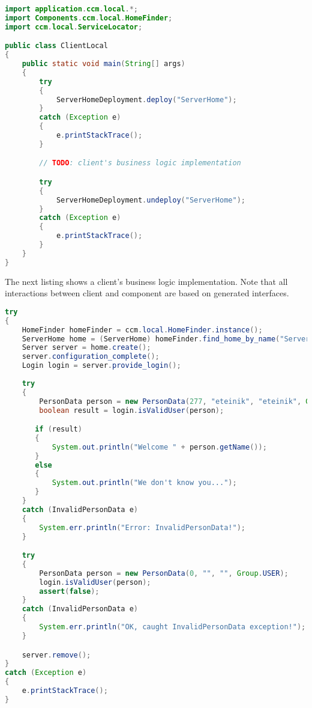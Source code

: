 \begin{footnotesize}
\begin{lstlisting}[language=Java]
import application.ccm.local.*;
import Components.ccm.local.HomeFinder;
import ccm.local.ServiceLocator;

public class ClientLocal
{
    public static void main(String[] args)
    {
        try
        {
            ServerHomeDeployment.deploy("ServerHome");
        }
        catch (Exception e)
        {
            e.printStackTrace();
        }

        // TODO: client's business logic implementation

        try
        {
            ServerHomeDeployment.undeploy("ServerHome");
        }
        catch (Exception e)
        {
            e.printStackTrace();
        }
    }
}
\end{lstlisting}
\end{footnotesize}

The next listing shows a client's business logic implementation. Note that all
interactions between client and component are based on generated interfaces.

\begin{footnotesize}
\begin{lstlisting}[language=Java]
try
{            
    HomeFinder homeFinder = ccm.local.HomeFinder.instance();
    ServerHome home = (ServerHome) homeFinder.find_home_by_name("ServerHome");
    Server server = home.create();
    server.configuration_complete();
    Login login = server.provide_login();
                        
    try
    {
        PersonData person = new PersonData(277, "eteinik", "eteinik", Group.USER);
        boolean result = login.isValidUser(person);

       if (result)
       {
           System.out.println("Welcome " + person.getName());
       }
       else
       {
           System.out.println("We don't know you...");
       }
    }
    catch (InvalidPersonData e)
    {
        System.err.println("Error: InvalidPersonData!");
    }

    try
    {
        PersonData person = new PersonData(0, "", "", Group.USER);
        login.isValidUser(person);
        assert(false);
    }
    catch (InvalidPersonData e)
    {
        System.err.println("OK, caught InvalidPersonData exception!");
    }

    server.remove();
}
catch (Exception e)
{
    e.printStackTrace();
}
\end{lstlisting}
\end{footnotesize}

